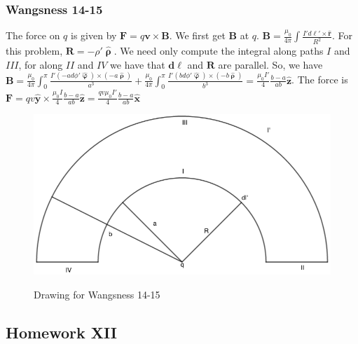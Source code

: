 \documentclass[oneside]{book}
\theoremstyle{mystyle}
\begin{document}
\subsubsection{Wangsness 14-15}
The force on $q$ is given by $\mathbf{F} = q\mathbf{v}\times \mathbf{B}$. We first get $\mathbf{B}$ at $q$. $\mathbf{B} = \frac{\mu_0}{4\pi} \int \frac{I' d\ell' \times \hat{\mathbf{r}}}{R^2}$. For this problem, $\mathbf{R} = -\rho' \hat{\boldsymbol{\uprho}}$. We need only compute the integral along paths $I$ and $III$, for along $II$ and $IV$ we have that $\mathbf{d\ell}$ and $\mathbf{R}$ are parallel. So, we have $\mathbf{B} = \frac{\mu_0}{4\pi} \int_{0}^{\pi} \frac{I'(-ad\phi' \hat{\boldsymbol{\upvarphi}})\times (-a\hat{\boldsymbol{\uprho}})}{a^3}+ \frac{\mu_0}{4\pi} \int_{0}^{\pi} \frac{I'(bd\phi' \hat{\boldsymbol{\upvarphi}})\times (-b\hat{\boldsymbol{\uprho}})}{b^3} = \frac{\mu_0 I'}{4} \frac{b-a}{ab} \hat{\mathbf{z}}$. The force is $\mathbf{F} = qv\hat{\mathbf{y}} \times \frac{\mu_0 I}{4} \frac{b-a}{ab} \hat{\mathbf{z}} = \frac{qv\mu_0 I'}{4} \frac{b-a}{ab} \hat{\mathbf{x}}$
\begin{figure}[htbp]
    \centering
    {\includegraphics[scale=0.4]{14-15.png}}
    \caption{Drawing for Wangsness 14-15}
\end{figure}
\subsection{Homework XII}
\end{document}
